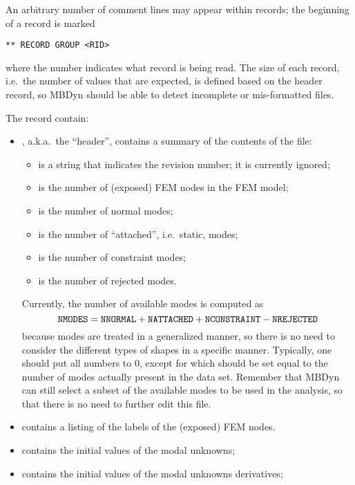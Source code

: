 An arbitrary number of comment lines may appear within records;
the beginning of a record is marked
\begin{verbatim}
** RECORD GROUP <RID>
\end{verbatim}
where the number  indicates what record is being read.
The size of each record, i.e.\ the number of values that are expected,
is defined based on the header record, so MBDyn should be able to detect
incomplete or mis-formatted files.

The record contain:
\begin{itemize}
\item {}, a.k.a.\ the ``header'', contains a summary
of the contents of the file:
	\begin{itemize}
	\item {} is a string that indicates the revision number;
	it is currently ignored;
	\item {} is the number of (exposed) FEM nodes 
	in the FEM model;
	\item {} is the number of normal modes;
	\item {} is the number of ``attached'',
	i.e.\ static, modes;
	\item {} is the number of constraint modes;
	\item {} is the number of rejected modes.
	\end{itemize}
Currently, the number of available modes is computed as
\begin{displaymath}
	\texttt{NMODES} = \texttt{NNORMAL} + \texttt{NATTACHED}
		+ \texttt{NCONSTRAINT} - \texttt{NREJECTED}
\end{displaymath}
because modes are treated in a generalized manner,
so there is no need to consider the different types of shapes
in a specific manner.
Typically, one should put all numbers to 0, except for
 which should be set equal to the number of modes
actually present in the data set.
Remember that MBDyn can still select a subset of the available 
modes to be used in the analysis, so that there is no need 
to further edit this file.

\item {} contains a listing of the  labels
of the (exposed) FEM nodes.

\item {} contains the initial values of the 
modal unknowns;

\item {} contains the initial values of the 
modal unknowns derivatives;


\end{itemize}
